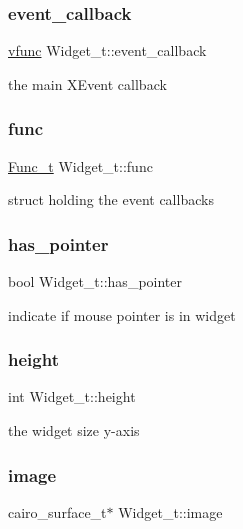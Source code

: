 \subsubsection{\texorpdfstring{event\+\_\+callback}{event\_callback}}
{\footnotesize\ttfamily \hyperlink{xwidget_8h_a6423c133fb634585762a77dda34befab}{vfunc} Widget\+\_\+t\+::event\+\_\+callback}

the main X\+Event callback \mbox{\label{structWidget__t_a225b9a175e132994a5aa73b59a2911ad}} 
\subsubsection{\texorpdfstring{func}{func}}
{\footnotesize\ttfamily \hyperlink{structFunc__t}{Func\+\_\+t} Widget\+\_\+t\+::func}

struct holding the event callbacks \mbox{\label{structWidget__t_ac8c396c698d816afad49fa751c3ca2c8}} 
\subsubsection{\texorpdfstring{has\+\_\+pointer}{has\_pointer}}
{\footnotesize\ttfamily bool Widget\+\_\+t\+::has\+\_\+pointer}

indicate if mouse pointer is in widget \mbox{\label{structWidget__t_a1def6d2237743e75a0b84ca0c34a6834}} 
\subsubsection{\texorpdfstring{height}{height}}
{\footnotesize\ttfamily int Widget\+\_\+t\+::height}

the widget size y-\/axis \mbox{\label{structWidget__t_a4e179b5ae7494b9533c8673ec3642a55}} 
\subsubsection{\texorpdfstring{image}{image}}
{\footnotesize\ttfamily cairo\+\_\+surface\+\_\+t$\ast$ Widget\+\_\+t\+::image}

